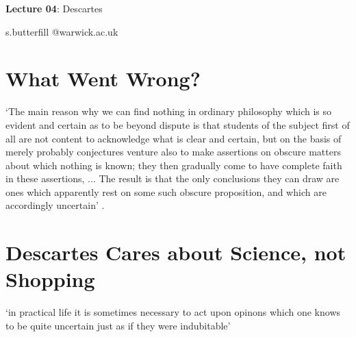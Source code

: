 \documentclass[12pt]{extarticle}
\date{}
\makeatletter
\def \ititle {Descartes}
\def \isubtitle {Lecture 02}
\def \iemail{s.butterfill @warwick.ac.uk}
\makeatother
\begin{document}
\begin{multicols*}{3}

\setlength\footnotesep{1em}












      

    
      
\def \ititle {Lecture 04}
 
\def \isubtitle {Descartes}
 
\begin{center}
 
{\Large
 
\textbf{\ititle}: \isubtitle
 
}
 
 
 
\iemail %
 
\end{center}
 

\section{What Went Wrong?}
‘The main reason why we can find nothing in ordinary philosophy which is so evident and certain as to be beyond dispute is that students of the subject first of all are not content to acknowledge what is clear and certain, but on the basis of merely probably conjectures venture also to make assertions on obscure matters about which nothing is known; they then gradually come to have complete faith in these assertions, ... The result is that the only conclusions they can draw are ones which apparently rest on some such obscure proposition, and which are accordingly uncertain’
\citep[p.~14, AT X:367--8]{descartes:1985_csm1}.
 
\section{Descartes Cares about Science, not Shopping}
‘in practical life 
it is sometimes necessary to act upon opinons which one knows to be quite uncertain just as if they were indubitable’
\citep[p.~126 AT 6:31]{descartes:1985_csm1}



\end{multicols*}
\end{document}
